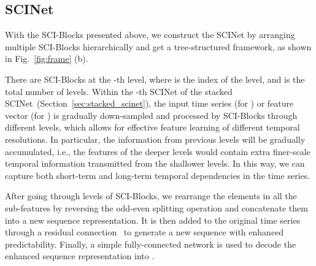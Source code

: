 \documentclass{article}
\begin{document}
\subsection{SCINet}
\label{sec:scinet}

With the SCI-Blocks presented above, we construct the SCINet by arranging multiple SCI-Blocks hierarchically and get a tree-structured framework, as shown in Fig.~\ref{fig:frame} (b).  


There are  SCI-Blocks at the -th level, where  is the index of the level, and  is the total number of levels. 
Within the -th SCINet of the stacked SCINet~(Section~\ref{sec:stacked_scinet}), the input time series  (for ) or feature vector  (for ) is gradually down-sampled and processed by SCI-Blocks through different levels, which allows for effective feature learning of different temporal resolutions. 
In particular, the information from previous levels will be gradually accumulated, i.e., the features of the deeper levels would contain extra finer-scale temporal information transmitted from the shallower levels. 
In this way, we can capture both short-term and long-term temporal dependencies in the time series. 

After going through  levels of SCI-Blocks, we rearrange the elements in all the sub-features by reversing the odd-even splitting operation and concatenate them into a new sequence representation. It is then added to the original time series through a residual connection~\citep{He2016DeepRL} to generate a new sequence with enhanced predictability. 
Finally, a simple fully-connected network is used to decode the enhanced sequence representation into . 




\iffalse
The number of levels  mainly depends on the size of the look-back window . 
Although increasing  would introduce extra computational cost, we will show that SCI-Net is still more efficient than other convolution-based methods such as TCN. 
As shown in Fig.~\ref{fig:related} (c), TCN employs convolutions with exponentially enlarged dilation factors. 
The number of convolution layers needed for TCN to cover a look-back window of length  is , and the resulted number of convolution operations is . 
On the contrary, SCINet does not rely on dilation to enlarge the effective receptive fields of feature extraction, thanks to interactive learning which allows global information interchange between the two downsampled parts. Thus, we do not need  levels to cover the look-back window, and the number of convolution operations of SCINet is , which can be much less than that of the TCN. As experimentally verified in Section~\ref{sec:ab},   would satisfy the requirements of most cases.
\fi
\end{document}

